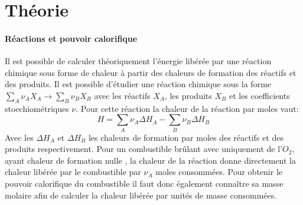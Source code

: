 \section{Théorie}


\paragraph*{Réactions et pouvoir calorifique}
Il est possible de calculer théoriquement l'énergie libérée par une réaction chimique sous forme de chaleur à partir des chaleurs de formation des réactifs et des produits. Il est possible d'étudier une réaction chimique sous la forme \(\sum_{A} \nu_A X_A \to \sum_{B} \nu_B X_B\) avec les réactifs \(X_A\), les produits \(X_B\) et les coefficients stoechiométriques \(\nu\). Pour cette réaction la chaleur de la réaction par moles vaut:
\begin{equation}
    H = \sum_{A} \nu_A \Delta H_A - \sum_{B} \nu_B \Delta H_B
    \label{eq:chaleur_réaction}
\end{equation}
Avec les \(\Delta H_A\) et \(\Delta H_B\) les chaleurs de formation par moles des réactifs et des produits respectivement. Pour un combustible brûlant avec uniquement de l'\(O_2\), ayant chaleur de formation nulle \cite{notice}, la chaleur de la réaction donne directement la chaleur libérée par le combustible par \(\nu_A\) moles consommées. Pour obtenir le pouvoir calorifique du combustible il faut donc également connaître sa masse molaire afin de calculer la chaleur libérée par unités de masse consommées.

